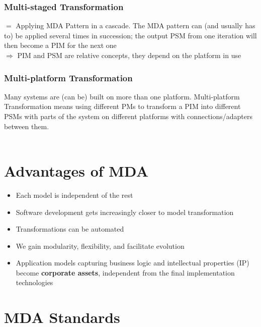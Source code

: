 		
			\subsubsection{Multi-staged Transformation}
				$ = $ Applying MDA Pattern in a cascade. The MDA pattern can (and usually has to) be  applied several times in succession; the output PSM from one iteration will then become a PIM for the next one\\ $ \Longrightarrow $ PIM and PSM are relative concepts,	they depend on the platform in use
				
			\subsubsection{Multi-platform Transformation}
				Many systems are (can be) built on more than one platform. Multi-platform Transformation means using different PMs to transform a PIM into different PSMs with parts of the system on different platforms with connections/adapters between them. \Biglb\\\\
				
	
	\section{Advantages of MDA}
		\begin{itemize}
			\item Each model is independent of the rest
			\item Software development gets increasingly closer to model transformation
			\item Transformations can be automated
			\item We gain modularity, flexibility, and facilitate evolution
			\item Application models capturing business logic and intellectual properties (IP) become \textbf{corporate assets},	independent from the final implementation technologies\Biglb
		\end{itemize}
	
	
	\section{MDA Standards}
